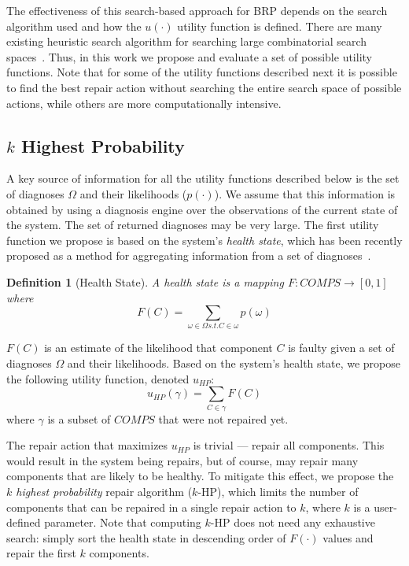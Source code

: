 \documentclass[letterpaper]{article}
\newtheorem{definition}{Definition}
\begin{document}
The effectiveness of this search-based approach for BRP depends on the search algorithm used and how the $u(\cdot)$ utility function is defined.
There are many existing heuristic search algorithm for searching large combinatorial search spaces~\cite{russell2010artificialIntelligence,edelkamp2011heuristic}. Thus, in this work we propose and evaluate a set of possible utility functions. Note that for some of the utility functions described next it is possible to find the best repair action without searching the entire search space of possible actions, while others are more computationally intensive.


\subsection{$k$ Highest Probability}

A key source of information for all the utility functions described below is the set of diagnoses $\Omega$ and their likelihoods ($p(\cdot)$). We assume that this information is obtained by using a diagnosis engine over the observations of the current state of the system. The set of returned diagnoses may be very large. The first utility function we propose is based on the system's {\em health state}, which has been recently proposed as a method for aggregating information from a set of diagnoses~\cite{Stern15shely}.

\begin{definition}[Health State]
A health state is a mapping $F: COMPS\rightarrow [0,1]$ where
\[ \displaystyle F(C)=\sum_{\omega\in \Omega s.t. C\in \omega} p(\omega)\]
\label{def:health-state}
\end{definition}
$F(C)$ is an estimate of the likelihood that component $C$ is faulty given a set of diagnoses $\Omega$ and their likelihoods.
Based on the system's health state, we propose the following utility function, denoted $u_{HP}$:
\[
u_{HP}(\gamma) = \sum_{C\in \gamma} F(C)
\]
where $\gamma$ is a subset of $COMPS$ that were not repaired yet.


The repair action that maximizes $u_{HP}$ is trivial --- repair all components.
This would result in the system being repairs, but of course, may repair many components that are likely to be healthy. To mitigate this effect, we propose the {\em $k$ highest probability} repair algorithm ($k$-HP), which limits the number of components that can be repaired in a single repair action to $k$, where $k$ is a user-defined parameter. Note that computing $k$-HP does not need any exhaustive search: simply sort the health state in descending order of $F(\cdot)$ values and repair the first $k$ components.
\end{document}
